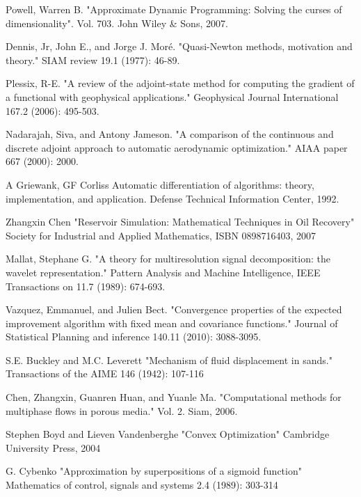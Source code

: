 \documentclass[a4paper,onecolumn]{article}
\theoremstyle{remark}
\begin{document}
\begin{thebibliography}{9}
Powell, Warren B.
"Approximate Dynamic Programming: Solving the curses of dimensionality".
Vol. 703. John Wiley \& Sons, 2007.

Dennis, Jr, John E., and Jorge J. Moré. 
"Quasi-Newton methods, motivation and theory." 
SIAM review 19.1 (1977): 46-89.

Plessix, R-E. 
"A review of the adjoint-state method for computing the gradient of a functional with geophysical applications." 
Geophysical Journal International 167.2 (2006): 495-503.

Nadarajah, Siva, and Antony Jameson. 
"A comparison of the continuous and discrete adjoint approach to automatic aerodynamic optimization." 
AIAA paper 667 (2000): 2000.

A Griewank, GF Corliss
Automatic differentiation of algorithms: theory, implementation, and application.
Defense Technical Information Center, 1992.

Zhangxin Chen
"Reservoir Simulation: Mathematical Techniques in Oil Recovery"
Society for Industrial and Applied Mathematics, ISBN 0898716403, 2007

Mallat, Stephane G. 
"A theory for multiresolution signal decomposition: the wavelet representation." 
Pattern Analysis and Machine Intelligence, IEEE Transactions on 11.7 (1989): 674-693.

Vazquez, Emmanuel, and Julien Bect. 
"Convergence properties of the expected improvement algorithm with fixed mean and covariance functions." 
Journal of Statistical Planning and inference 140.11 (2010): 3088-3095.

S.E. Buckley and M.C. Leverett
"Mechanism of fluid displacement in sands."
Transactions of the AIME 146 (1942): 107-116

Chen, Zhangxin, Guanren Huan, and Yuanle Ma. 
"Computational methods for multiphase flows in porous media."
Vol. 2. Siam, 2006.

Stephen Boyd and Lieven Vandenberghe
"Convex Optimization"
Cambridge University Press, 2004

G. Cybenko
"Approximation by superpositions of a sigmoid function"
Mathematics of control, signals and systems 2.4 (1989): 303-314


\end{thebibliography}
\end{document}
